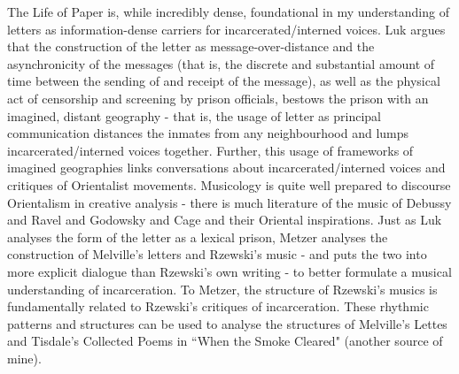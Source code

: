\documentclass[12pt,letterpaper]{article}
\begin{document}
The Life of Paper is, while incredibly dense, foundational in my 
understanding of letters as information-dense carriers for 
incarcerated/interned voices. Luk argues that the construction of 
the letter as message-over-distance and the asynchronicity of the 
messages (that is, the discrete and substantial amount of time 
between the sending of and receipt of the message), as well as the 
physical act of censorship and screening by prison officials, bestows 
the prison with an imagined, distant geography - that is, the usage 
of letter as principal communication distances the inmates from 
any neighbourhood and lumps incarcerated/interned voices together. 
Further, this usage of frameworks of imagined geographies links 
conversations about incarcerated/interned voices and critiques of 
Orientalist movements. Musicology is quite well prepared to discourse 
Orientalism in creative analysis - there is much literature of the 
music of Debussy and Ravel and Godowsky and Cage and their Oriental 
inspirations. Just as Luk analyses the form of the letter as a 
lexical prison, Metzer analyses the construction of Melville's 
letters and Rzewski's music - and puts the two into more explicit 
dialogue than Rzewski's own writing - to better formulate a musical 
understanding of incarceration. To Metzer, the structure of Rzewski's 
musics is fundamentally related to Rzewski's critiques of incarceration. 
These rhythmic patterns and structures can be used to analyse the structures 
of Melville's Lettes and Tisdale's Collected Poems in ``When the Smoke Cleared" 
(another source of mine).


\nocite{attica-poems}

\clearpage

\printbibliography
\end{document}
